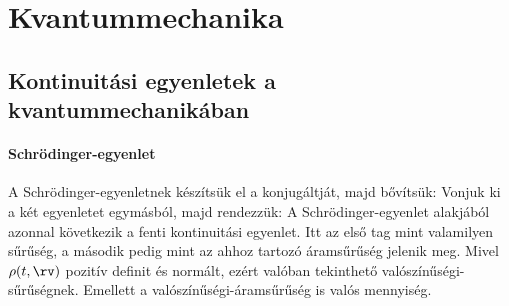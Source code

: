  \section{Kvantummechanika}
  
  \subsection{Kontinuitási egyenletek a kvantummechanikában}\label{ss:A08-kv}
   
   \paragraph{Schrödinger-egyenlet}
    
    A Schrödinger-egyenletnek készítsük el a konjugáltját, majd bővítsük:
    Vonjuk ki a két egyenletet egymásból, majd rendezzük:
    A Schrödinger-egyenlet alakjából azonnal következik a fenti kontinuitási egyenlet.
   Itt az első tag mint valamilyen sűrűség, a második pedig mint az ahhoz tartozó áramsűrűség jelenik meg.
   Mivel $\rho(t,\rv)$ pozitív definit és normált, ezért valóban tekinthető valószínűségi-sűrűségnek.
   Emellett a valószínűségi-áramsűrűség is valós mennyiség.
    
